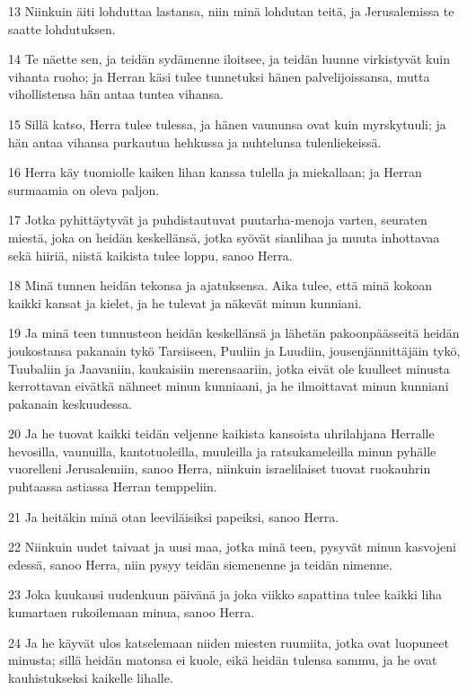 \par 13 Niinkuin äiti lohduttaa lastansa, niin minä lohdutan teitä, ja Jerusalemissa te saatte lohdutuksen.
\par 14 Te näette sen, ja teidän sydämenne iloitsee, ja teidän luunne virkistyvät kuin vihanta ruoho; ja Herran käsi tulee tunnetuksi hänen palvelijoissansa, mutta vihollistensa hän antaa tuntea vihansa.
\par 15 Sillä katso, Herra tulee tulessa, ja hänen vaununsa ovat kuin myrskytuuli; ja hän antaa vihansa purkautua hehkussa ja nuhtelunsa tulenliekeissä.
\par 16 Herra käy tuomiolle kaiken lihan kanssa tulella ja miekallaan; ja Herran surmaamia on oleva paljon.
\par 17 Jotka pyhittäytyvät ja puhdistautuvat puutarha-menoja varten, seuraten miestä, joka on heidän keskellänsä, jotka syövät sianlihaa ja muuta inhottavaa sekä hiiriä, niistä kaikista tulee loppu, sanoo Herra.
\par 18 Minä tunnen heidän tekonsa ja ajatuksensa. Aika tulee, että minä kokoan kaikki kansat ja kielet, ja he tulevat ja näkevät minun kunniani.
\par 19 Ja minä teen tunnusteon heidän keskellänsä ja lähetän pakoonpäässeitä heidän joukostansa pakanain tykö Tarsiiseen, Puuliin ja Luudiin, jousenjännittäjäin tykö, Tuubaliin ja Jaavaniin, kaukaisiin merensaariin, jotka eivät ole kuulleet minusta kerrottavan eivätkä nähneet minun kunniaani, ja he ilmoittavat minun kunniani pakanain keskuudessa.
\par 20 Ja he tuovat kaikki teidän veljenne kaikista kansoista uhrilahjana Herralle hevosilla, vaunuilla, kantotuoleilla, muuleilla ja ratsukameleilla minun pyhälle vuorelleni Jerusalemiin, sanoo Herra, niinkuin israelilaiset tuovat ruokauhrin puhtaassa astiassa Herran temppeliin.
\par 21 Ja heitäkin minä otan leeviläisiksi papeiksi, sanoo Herra.
\par 22 Niinkuin uudet taivaat ja uusi maa, jotka minä teen, pysyvät minun kasvojeni edessä, sanoo Herra, niin pysyy teidän siemenenne ja teidän nimenne.
\par 23 Joka kuukausi uudenkuun päivänä ja joka viikko sapattina tulee kaikki liha kumartaen rukoilemaan minua, sanoo Herra.
\par 24 Ja he käyvät ulos katselemaan niiden miesten ruumiita, jotka ovat luopuneet minusta; sillä heidän matonsa ei kuole, eikä heidän tulensa sammu, ja he ovat kauhistukseksi kaikelle lihalle.


